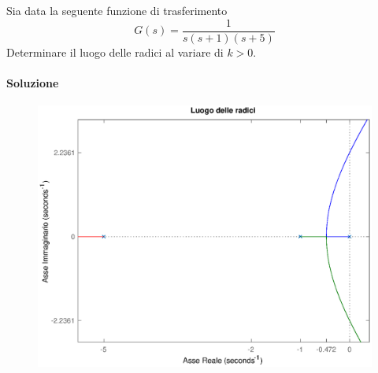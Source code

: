 \begin{esercizio}
Sia data la seguente funzione di trasferimento
\[
	G(s) = \frac{1}{s(s+1)(s+5)}
\]
Determinare il luogo delle radici al variare di \(k>0\).

\paragraph{Soluzione}

\begin{figure}[ht]
	\centering
	\includegraphics[scale=.6]{mod1/assets/rl_ex33}
\end{figure}


\end{esercizio}
